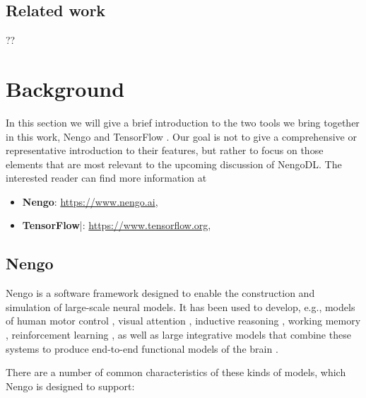 \documentclass{article}
\begin{document}
\subsection{Related work}

??

\section{Background}
\label{sec:background}

In this section we will give a brief introduction to the two tools we bring together in this work, Nengo \citep{Bekolay2014} and TensorFlow \citep{Abadi2016}.  Our goal is not to give a comprehensive or representative introduction to their features, but rather to focus on those elements that are most relevant to the upcoming discussion of NengoDL.  The interested reader can find more information at

\begin{itemize}
\item {\bf Nengo}: \url{https://www.nengo.ai}, \citet{Bekolay2014}
\item {\bf TensorFlow}|: \url{https://www.tensorflow.org}, \citet{Abadi2016}
\end{itemize}

\subsection{Nengo}

Nengo is a software framework designed to enable the construction and simulation of large-scale neural models.  It has been used to develop, e.g., models of human motor control \citep{needcitation}, visual attention \citep{needcitation}, inductive reasoning \citep{Rasmussen2014}, working memory \citep{Choo2010}, reinforcement learning \citep{Stewart2012,Rasmussen2017}, as well as large integrative models that combine these systems to produce end-to-end functional models of the brain \citep{Eliasmith2012a}.

There are a number of common characteristics of these kinds of models, which Nengo is designed to support:
\end{document}
